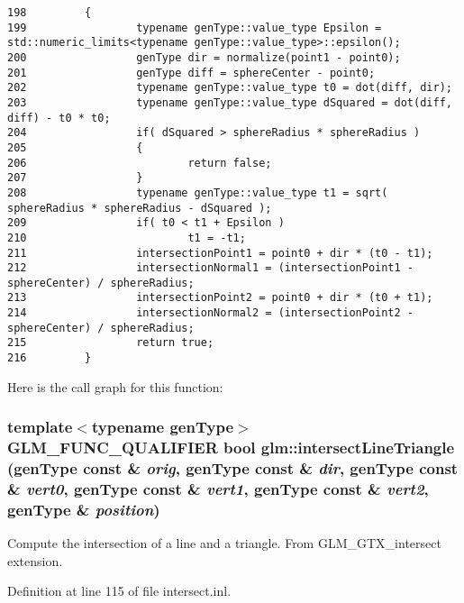 \begin{Code}\begin{verbatim}198         {
199                 typename genType::value_type Epsilon = std::numeric_limits<typename genType::value_type>::epsilon();
200                 genType dir = normalize(point1 - point0);
201                 genType diff = sphereCenter - point0;
202                 typename genType::value_type t0 = dot(diff, dir);
203                 typename genType::value_type dSquared = dot(diff, diff) - t0 * t0;
204                 if( dSquared > sphereRadius * sphereRadius )
205                 {
206                         return false;
207                 }
208                 typename genType::value_type t1 = sqrt( sphereRadius * sphereRadius - dSquared );
209                 if( t0 < t1 + Epsilon )
210                         t1 = -t1;
211                 intersectionPoint1 = point0 + dir * (t0 - t1);
212                 intersectionNormal1 = (intersectionPoint1 - sphereCenter) / sphereRadius;
213                 intersectionPoint2 = point0 + dir * (t0 + t1);
214                 intersectionNormal2 = (intersectionPoint2 - sphereCenter) / sphereRadius;
215                 return true;
216         }
\end{verbatim}
\end{Code}




Here is the call graph for this function:\hypertarget{group__gtx__intersect_g1aa5d241478d1493ff4d8c22b8d9e293}{
\subsubsection[intersectLineTriangle]{\setlength{\rightskip}{0pt plus 5cm}template$<$typename genType$>$ GLM\_\-FUNC\_\-QUALIFIER bool glm::intersectLineTriangle (genType const \& {\em orig}, \/  genType const \& {\em dir}, \/  genType const \& {\em vert0}, \/  genType const \& {\em vert1}, \/  genType const \& {\em vert2}, \/  genType \& {\em position})}}
\label{group__gtx__intersect_g1aa5d241478d1493ff4d8c22b8d9e293}


Compute the intersection of a line and a triangle. From GLM\_\-GTX\_\-intersect extension. 

Definition at line 115 of file intersect.inl.

